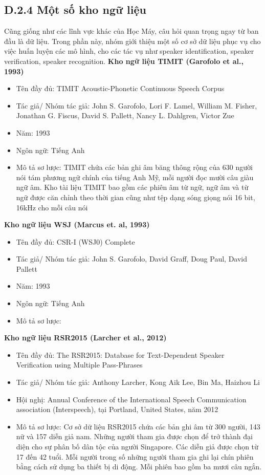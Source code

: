 \documentclass{article}
\begin{document}
	\subsection{D.2.4 Một số kho ngữ liệu}
	\qquad Cũng giống như các lĩnh vực khác của Học Máy, câu hỏi quan trọng ngay từ ban đầu là dữ liệu. Trong phần này, nhóm giới thiệu một số cơ sở dữ liệu phục vụ cho việc huấn luyện các mô hình, cho các tác vụ như speaker identification, speaker verification, speaker recognition.\newline
	\textbf{Kho ngữ liệu TIMIT (Garofolo et al., 1993)}
	\begin{itemize}
		\item Tên đầy đủ: TIMIT Acoustic-Phonetic Continuous Speech Corpus
		\item Tác giả/ Nhóm tác giả: 	John S. Garofolo, Lori F. Lamel, William M. Fisher, Jonathan G. Fiscus, David S. Pallett, Nancy L. Dahlgren, Victor Zue
		\item Năm: 1993
		\item Ngôn ngữ: Tiếng Anh
		\item Mô tả sơ lược: TIMIT chứa các bản ghi âm băng thông rộng của 630 người nói tám phương ngữ chính của tiếng Anh Mỹ, mỗi người đọc mười câu giàu ngữ âm. Kho tài liệu TIMIT bao gồm các phiên âm từ ngữ, ngữ âm và từ ngữ được căn chỉnh theo thời gian cũng như tệp dạng sóng giọng nói 16 bit, 16kHz cho mỗi câu nói
	\end{itemize}	
	\textbf{Kho ngữ liệu WSJ (Marcus et. al, 1993)}
	\begin{itemize}
		\item Tên đầy đủ: CSR-I (WSJ0) Complete
		\item Tác giả/ Nhóm tác giả: John S. Garofolo, David Graff, Doug Paul, David Pallett
		\item Năm: 1993
		\item Ngôn ngữ: Tiếng Anh
		\item Mô tả sơ lược: 
	\end{itemize}	
	\textbf{Kho ngữ liệu RSR2015 (Larcher et al., 2012)}
	\begin{itemize}
		\item Tên đầy đủ: The RSR2015: Database for Text-Dependent Speaker Verification using Multiple Pass-Phrases
		\item Tác giả/ Nhóm tác giả: Anthony Larcher, Kong Aik Lee, Bin Ma, Haizhou Li
		\item Hội nghị: Annual Conference of the International Speech
		Communication association (Interspeech), tại Portland, United States, năm 2012
		\item Mô tả sơ lược: Cơ sở dữ liệu RSR2015 chứa các bản ghi âm từ 300 người, 143 nữ và 157 diễn giả nam. Những người tham gia được chọn để trở thành đại diện cho sự phân bố dân tộc của người Singapore. Các diễn giả được chọn từ 17 đến 42 tuổi. Mỗi người trong số những người tham gia ghi lại chín phiên bằng cách sử dụng ba thiết bị di động. Mỗi phiên bao gồm ba mươi câu ngắn.
	\end{itemize}
\end{document}
